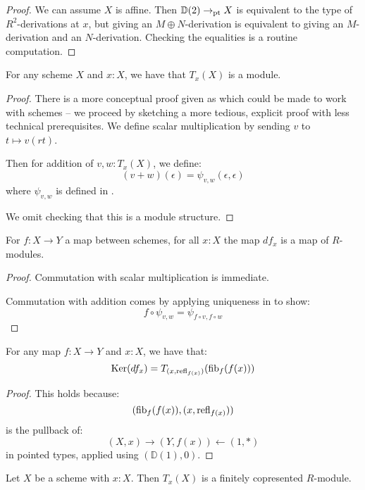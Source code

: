 \begin{proof}
We can assume $X$ is affine. Then $\mathbb{D}(2)\to_{\mathrm{pt}} X$ is equivalent to the type of $R^2$-derivations at $x$, but giving an $M\oplus N$-derivation is equivalent to giving an $M$-derivation and an $N$-derivation. Checking the equalities is a routine computation.
\end{proof}

\begin{lemma}
For any scheme $X$ and $x:X$, we have that $T_x(X)$ is a module.
\end{lemma}

\begin{proof}
There is a more conceptual proof given as \cite[Theorem 4.2.19]{david-orbifolds} which could be made to work with schemes -- we proceed by sketching a more tedious, explicit proof with less technical prerequisites.
We define scalar multiplication by sending $v$ to $t\mapsto v(rt)$.

Then for addition of $v,w:T_x(X)$, we define:
\[(v+w)(\epsilon) = \psi_{v,w}(\epsilon,\epsilon)\]
where $\psi_{v,w}$ is defined in .

We omit checking that this is a module structure.
\end{proof}

\begin{lemma}
For $f:X\to Y$ a map between schemes, for all $x:X$ the map $df_x$ is a map of $R$-modules.
\end{lemma}

\begin{proof}
Commutation with scalar multiplication is immediate.

Commutation with addition comes by applying uniqueness in  to show:
\[f\circ \psi_{v,w} = \psi_{f\circ v,f\circ w}\]
\end{proof}

\begin{lemma}\label{kernel-is-tangent-of-fibers}
For any map $f:X\to Y$ and $x:X$, we have that:
\[
\mathrm{Ker}(df_x) = T_{(x,\mathrm{refl}_{f(x)})}(\mathrm{fib}_f(f(x)))
\]
\end{lemma}

\begin{proof}
This holds because:
\[
(\mathrm{fib}_f(f(x)),(x,\mathrm{refl}_{f(x)}))
\]
is the pullback of:
\[
(X,x) \to (Y,f(x)) \leftarrow (1,*)
\]
in pointed types, applied using $(\mathbb{D}(1),0)$.
\end{proof}

\begin{lemma}\label{tangent-finite-copresented}
Let $X$ be a scheme with $x : X$. Then $T_x(X)$ is a finitely
copresented $R$-module.
\end{lemma}

